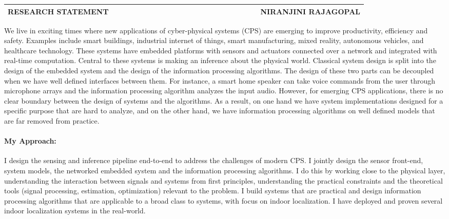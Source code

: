 \documentclass[10pt]{article}
\date{}
\begin{document}

\begin{table}
\color{blue}
\begin{tabular*}{\textwidth}{l r}
\large\textbf{RESEARCH STATEMENT} & 
\hfill \ \ \ \ \ \ \ \ \ \ \ \ \ \ \ \ \ \ \ \
\ \ \ \ \ \ \ \ \ \ \ \ \ \ \ 
\large\textbf{NIRANJINI RAJAGOPAL}\\
\hline
\end{tabular*}

\end{table}


We live in exciting times where new applications of cyber-physical systems
(CPS) are emerging to improve productivity, efficiency and safety. Examples include smart buildings, industrial internet of things, smart manufacturing, mixed reality, autonomous vehicles, and healthcare technology. These systems have embedded platforms with sensors and actuators connected over a network and integrated with real-time computation. Central to these systems is making an inference about the physical world. Classical system design is split into the design of the embedded system and the design of the information processing algorithms.
The design of these two parts can be decoupled when we have well defined interfaces between them. For instance, a smart home speaker can take voice commands from the user through microphone arrays and the information processing algorithm analyzes the input audio.  However, for emerging CPS applications, there is no clear boundary between the design of systems and the algorithms.  
As a result, on one hand we have system implementations designed for a specific purpose that are hard to analyze, and on the other hand, we have information processing algorithms on well defined models that are far removed from practice.\\

\paragraph{My Approach: }
I design the sensing and inference pipeline end-to-end to address the challenges of modern CPS. I jointly design the sensor front-end, system models, the networked embedded system and the information processing algorithms. I do this by working close to the physical layer, understanding the interaction between signals and systems from first principles, understanding the practical constraints and the theoretical tools (signal processing, estimation, optimization) relevant to the problem. 
I build systems that are practical and design information processing algorithms that are applicable to a broad class to systems, with focus on indoor localization. I have deployed and proven several indoor localization systems in the real-world.
\end{document}
